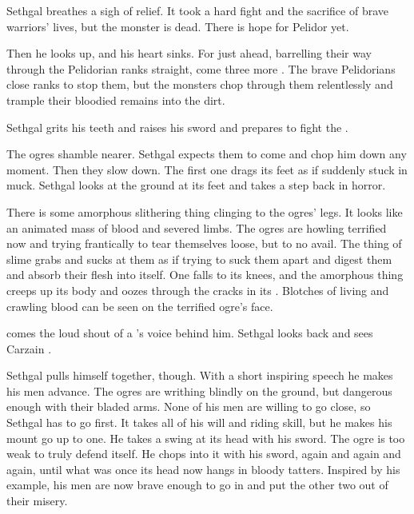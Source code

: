 Sethgal breathes a sigh of relief. 
It took a hard fight and the sacrifice of brave warriors' lives, but the monster is dead. 
There is hope for Pelidor yet. 

Then he looks up, and his heart sinks. 
For just ahead, barrelling their way through the Pelidorian ranks straight, come three more \nephilim.
The brave Pelidorians close ranks to stop them, but the monsters chop through them relentlessly and trample their bloodied remains into the dirt. 

Sethgal grits his teeth and raises his sword and prepares to fight the \nephilim.


The ogres shamble nearer. 
Sethgal expects them to come and chop him down any moment. 
Then they slow down. 
The first one drags its feet as if suddenly stuck in muck. 
Sethgal looks at the ground at its feet and takes a step back in horror. 

There is some amorphous slithering thing clinging to the ogres' legs. 
It looks like an animated mass of blood and severed limbs. 
The ogres are howling terrified now and trying frantically to tear themselves loose, but to no avail. 
The thing of slime grabs and sucks at them as if trying to suck them apart and digest them and absorb their flesh into itself. 
One \nephil falls to its knees, and the amorphous thing creeps up its body and oozes through the cracks in its \armour.
Blotches of living and crawling blood can be seen on the terrified ogre's face. 

\ta{\Rah[Sethgal]!} comes the loud shout of a \human's voice behind him.
Sethgal looks back and sees Carzain \Shachar. 



Sethgal pulls himself together, though.
With a short inspiring speech he makes his men advance. 
The ogres are writhing blindly on the ground, but dangerous enough with their bladed arms. 
None of his men are willing to go close, so Sethgal has to go first.
It takes all of his will and riding skill, but he makes his mount go up to one.
He takes a swing at its head with his sword. 
The ogre is too weak to truly defend itself. 
He chops into it with his sword, again and again and again, until what was once its head now hangs in bloody tatters. 
Inspired by his example, his men are now brave enough to go in and put the other two \nephilim out of their misery. 

